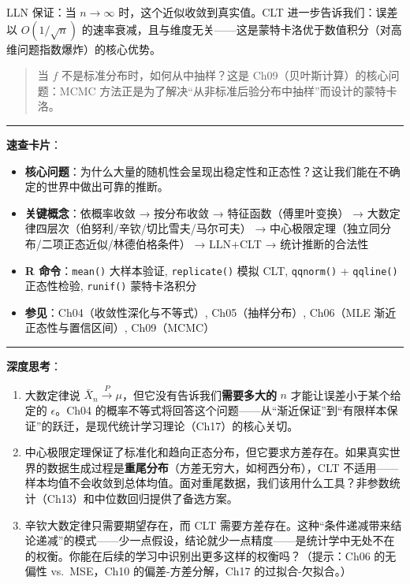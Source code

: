 \documentclass[
]{book}
\providecommand{\tightlist}{%
  \setlength{\itemsep}{0pt}\setlength{\parskip}{0pt}}
\begin{document}
LLN 保证：当 \(n \to \infty\) 时，这个近似收敛到真实值。CLT 进一步告诉我们：误差以 \(O(1/\sqrt{n})\) 的速率衰减，且与维度无关------这是蒙特卡洛优于数值积分（对高维问题指数爆炸）的核心优势。

\begin{quote}
当 \(f\) 不是标准分布时，如何从中抽样？这是 Ch09（贝叶斯计算）的核心问题：MCMC 方法正是为了解决``从非标准后验分布中抽样''而设计的蒙特卡洛。
\end{quote}

\begin{center}\rule{0.5\linewidth}{0.5pt}\end{center}

\textbf{速查卡片}：

\begin{itemize}
\tightlist
\item
  \textbf{核心问题}：为什么大量的随机性会呈现出稳定性和正态性？这让我们能在不确定的世界中做出可靠的推断。
\item
  \textbf{关键概念}：依概率收敛 → 按分布收敛 → 特征函数（傅里叶变换） → 大数定律四层次（伯努利/辛钦/切比雪夫/马尔可夫） → 中心极限定理（独立同分布/二项正态近似/林德伯格条件） → LLN+CLT → 统计推断的合法性
\item
  \textbf{R 命令}：\texttt{mean()} 大样本验证, \texttt{replicate()} 模拟 CLT, \texttt{qqnorm()} + \texttt{qqline()} 正态性检验, \texttt{runif()} 蒙特卡洛积分
\item
  \textbf{参见}：Ch04（收敛性深化与不等式）, Ch05（抽样分布）, Ch06（MLE 渐近正态性与置信区间）, Ch09（MCMC）
\end{itemize}

\begin{center}\rule{0.5\linewidth}{0.5pt}\end{center}

\textbf{深度思考}：

\begin{enumerate}
\def\labelenumi{\arabic{enumi}.}
\item
  大数定律说 \(\bar{X}_n \xrightarrow{P} \mu\)，但它没有告诉我们\textbf{需要多大的} \(n\) 才能让误差小于某个给定的 \(\epsilon\)。Ch04 的概率不等式将回答这个问题------从``渐近保证''到``有限样本保证''的跃迁，是现代统计学习理论（Ch17）的核心关切。
\item
  中心极限定理保证了标准化和趋向正态分布，但它要求方差存在。如果真实世界的数据生成过程是\textbf{重尾分布}（方差无穷大，如柯西分布），CLT 不适用------样本均值不会收敛到总体均值。面对重尾数据，我们该用什么工具？非参数统计（Ch13）和中位数回归提供了备选方案。
\item
  辛钦大数定律只需要期望存在，而 CLT 需要方差存在。这种``条件递减带来结论递减''的模式------少一点假设，结论就少一点精度------是统计学中无处不在的权衡。你能在后续的学习中识别出更多这样的权衡吗？（提示：Ch06 的无偏性 vs.~MSE，Ch10 的偏差-方差分解，Ch17 的过拟合-欠拟合。）
\end{enumerate}
\end{document}
